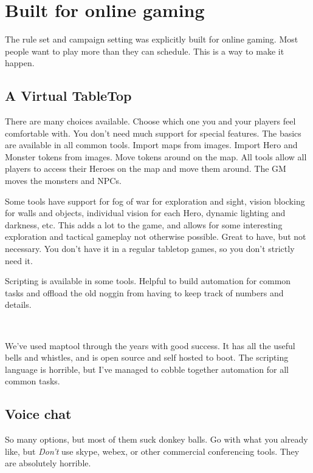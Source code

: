 \clearpage %

\section*{Built for online gaming}

The rule set and campaign setting was explicitly built for online gaming. Most people want to play more than they can schedule. This is a way to make it happen.


\subsection*{A Virtual TableTop}

There are many choices available. Choose which one you and your players feel comfortable with. You don't need much support for special features. The basics are available in all common tools. Import maps from images. Import Hero and Monster tokens from images. Move tokens around on the map. All tools allow all players to access their Heroes on the map and move them around. The GM moves the monsters and NPCs. 

Some tools have support for fog of war for exploration and sight, vision blocking for walls and objects, individual vision for each Hero, dynamic lighting and darkness, etc. 
This adds a lot to the game, and allows for some interesting exploration and tactical gameplay not otherwise possible.
Great to have, but not necessary. You don't have it in a regular tabletop games, so you don't strictly need it.

Scripting is available in some tools. Helpful to build automation for common tasks and offload the old noggin from having to keep track of numbers and details.

\

We've used maptool through the years with good success. It has all the useful bells and whistles, and is open source and self hosted to boot. The scripting language is horrible, but I've managed to cobble together automation for all common tasks.


\subsection*{Voice chat}

So many options, but most of them suck donkey balls. Go with what you already like, but \emph{Don't} use skype, webex, or other commercial conferencing tools. They are absolutely horrible.

